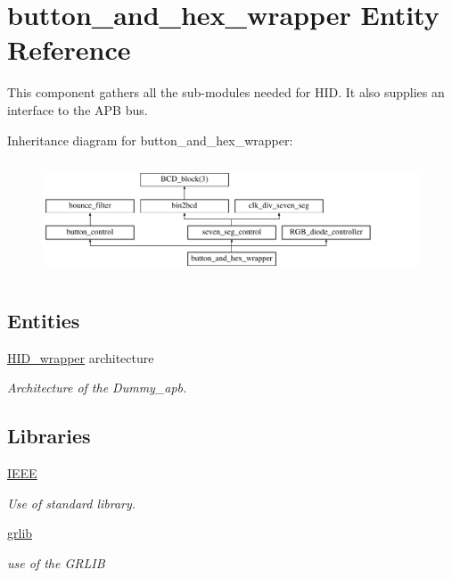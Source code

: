 \hypertarget{classbutton__and__hex__wrapper}{\section{button\-\_\-and\-\_\-hex\-\_\-wrapper Entity Reference}
\label{classbutton__and__hex__wrapper}
}


This component gathers all the sub-\/modules needed for H\-I\-D. It also supplies an interface to the A\-P\-B bus.  


Inheritance diagram for button\-\_\-and\-\_\-hex\-\_\-wrapper\-:\begin{figure}[H]
\begin{center}
\leavevmode
\includegraphics[height=3.435583cm]{classbutton__and__hex__wrapper}
\end{center}
\end{figure}
\subsection*{Entities}
\begin{DoxyCompactItemize}
\item 
\hyperlink{classbutton__and__hex__wrapper_1_1HID__wrapper}{H\-I\-D\-\_\-wrapper} architecture
\begin{DoxyCompactList}\small\item\em Architecture of the Dummy\-\_\-apb. \end{DoxyCompactList}\end{DoxyCompactItemize}
\subsection*{Libraries}
 \begin{DoxyCompactItemize}
\item 
\hypertarget{classbutton__and__hex__wrapper_ae4f03c286607f3181e16b9aa12d0c6d4}{\hyperlink{classbutton__and__hex__wrapper_ae4f03c286607f3181e16b9aa12d0c6d4}{I\-E\-E\-E} }\label{classbutton__and__hex__wrapper_ae4f03c286607f3181e16b9aa12d0c6d4}

\begin{DoxyCompactList}\small\item\em Use of standard library. \end{DoxyCompactList}\item 
\hypertarget{classbutton__and__hex__wrapper_a2306e6b22fb33ca087d2f1b289b10e28}{\hyperlink{classbutton__and__hex__wrapper_a2306e6b22fb33ca087d2f1b289b10e28}{grlib} }\label{classbutton__and__hex__wrapper_a2306e6b22fb33ca087d2f1b289b10e28}

\begin{DoxyCompactList}\small\item\em use of the G\-R\-L\-I\-B \end{DoxyCompactList}\end{DoxyCompactItemize}
